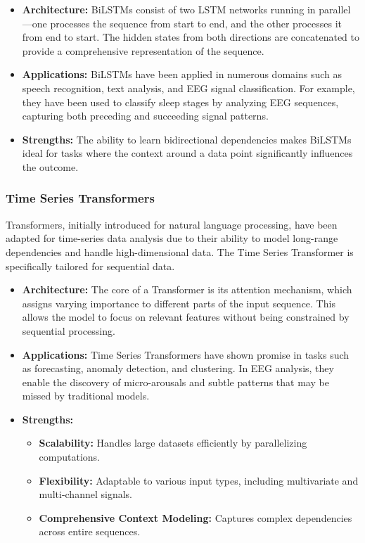 \documentclass[a4paper,12pt,twoside]{article}
\begin{document}
\begin{itemize}
    \item \textbf{Architecture:} BiLSTMs consist of two LSTM networks running in parallel—one processes the sequence from start to end, and the other processes it from end to start. The hidden states from both directions are concatenated to provide a comprehensive representation of the sequence.
    \item \textbf{Applications:} BiLSTMs have been applied in numerous domains such as speech recognition, text analysis, and EEG signal classification. For example, they have been used to classify sleep stages by analyzing EEG sequences, capturing both preceding and succeeding signal patterns.
    \item \textbf{Strengths:} The ability to learn bidirectional dependencies makes BiLSTMs ideal for tasks where the context around a data point significantly influences the outcome.
\end{itemize}

\subsubsection{Time Series Transformers}

Transformers, initially introduced for natural language processing, have been adapted for time-series data analysis due to their ability to model long-range dependencies and handle high-dimensional data. The Time Series Transformer is specifically tailored for sequential data.

\begin{itemize}
    \item \textbf{Architecture:} The core of a Transformer is its attention mechanism, which assigns varying importance to different parts of the input sequence. This allows the model to focus on relevant features without being constrained by sequential processing.
    \item \textbf{Applications:} Time Series Transformers have shown promise in tasks such as forecasting, anomaly detection, and clustering. In EEG analysis, they enable the discovery of micro-arousals and subtle patterns that may be missed by traditional models.
    \item \textbf{Strengths:} 
    \begin{itemize}
        \item \textbf{Scalability:} Handles large datasets efficiently by parallelizing computations.
        \item \textbf{Flexibility:} Adaptable to various input types, including multivariate and multi-channel signals.
        \item \textbf{Comprehensive Context Modeling:} Captures complex dependencies across entire sequences.
    \end{itemize}
\end{itemize}
\end{document}

